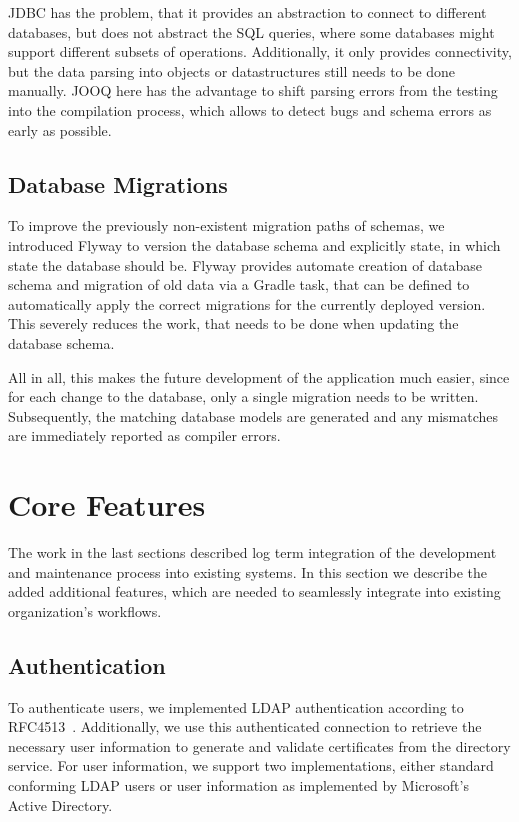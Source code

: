 JDBC has the problem, that it provides an abstraction to connect to different databases, but does not abstract the
SQL queries, where some databases might support different subsets of operations.
Additionally, it only provides connectivity, but the data parsing into objects or datastructures still needs to be done
manually.
JOOQ here has the advantage to shift parsing errors from the testing into the compilation process, which allows to
detect bugs and schema errors as early as possible.

\subsection*{Database Migrations}
To improve the previously non-existent migration paths of schemas, we introduced Flyway to version the database schema
and explicitly state, in which state the database should be.
Flyway provides automate creation of database schema and migration of old data via a Gradle task, that can be defined to
automatically apply the correct migrations for the currently deployed version.
This severely reduces the work, that needs to be done when updating the database schema.

All in all, this makes the future development of the application much easier, since for each change to the database,
only a single migration needs to be written.
Subsequently, the matching database models are generated and any mismatches are immediately reported as compiler errors.

\section{Core Features}\label{sec:coreFeatures}

The work in the last sections described log term integration of the development and maintenance process into existing
systems.
In this section we describe the added additional features, which are needed to seamlessly integrate into existing
organization's workflows.

\subsection*{Authentication}
To authenticate users, we implemented LDAP authentication according to RFC4513~\cite{RFC4513}.
Additionally, we use this authenticated connection to retrieve the necessary user information to generate and validate
certificates from the directory service.
For user information, we support two implementations, either standard conforming LDAP users or user information as
implemented by Microsoft's Active Directory.

